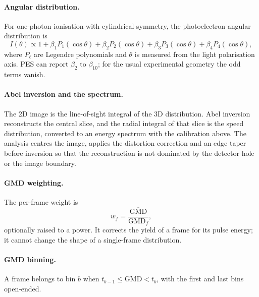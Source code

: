 \documentclass[11pt,a4paper]{article}
\begin{document}
\paragraph{Angular distribution.} For one-photon ionisation with cylindrical
symmetry, the photoelectron angular distribution is
\begin{equation}
  I(\theta) \propto 1 + \beta_1 P_1(\cos\theta)
                 + \beta_2 P_2(\cos\theta)
                 + \beta_3 P_3(\cos\theta)
                 + \beta_4 P_4(\cos\theta),
\end{equation}
where $P_\ell$ are Legendre polynomials and $\theta$ is measured from the
light polarisation axis. PES can report $\beta_2$ to $\beta_{10}$; for
the usual experimental geometry the odd terms vanish.

\paragraph{Abel inversion and the spectrum.} The 2D image is the line-of-sight
integral of the 3D distribution. Abel inversion reconstructs the central
slice, and the radial integral of that slice is the speed distribution,
converted to an energy spectrum with the calibration above. The analysis
centres the image, applies the distortion correction and an edge taper before
inversion so that the reconstruction is not dominated by the detector hole or
the image boundary.

\paragraph{GMD weighting.} The per-frame weight is
\begin{equation}
  w_f = \frac{\overline{\mathrm{GMD}}}{\mathrm{GMD}_f},
\end{equation}
optionally raised to a power. It corrects the yield of a frame for its pulse
energy; it cannot change the shape of a single-frame distribution.

\paragraph{GMD binning.} A frame belongs to bin $b$ when
$t_{b-1} \le \mathrm{GMD} < t_b$, with the first and last bins open-ended.
\end{document}
